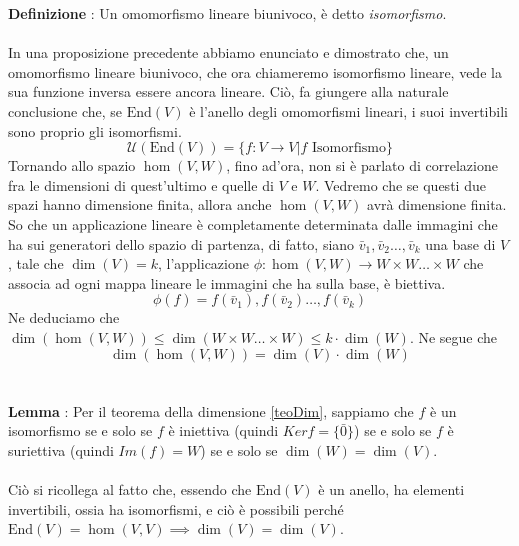 \documentclass[12pt, letterpaper]{article}
\newcommand{\ve}{{\bar v}}
\newcommand{\acc}{\\\hphantom{}\\}
\newcommand{\End}{{\text{End}}}
\begin{document}
 \textbf{Definizione} : Un omomorfismo lineare biunivoco, è detto \textit{isomorfismo}.\acc 
 In una proposizione precedente abbiamo enunciato e dimostrato che, un omomorfismo lineare biunivoco, che ora chiameremo 
 isomorfismo lineare, vede la sua funzione inversa essere ancora lineare. Ciò, fa giungere alla naturale conclusione che, 
 se \(\End(V)\) è l'anello degli omomorfismi lineari, i suoi invertibili sono proprio gli isomorfismi.
 $$\mathcal{U}(\End(V))=\{f:V\rightarrow V| f\text{ Isomorfismo}\}$$
 Tornando allo spazio \(\hom(V,W)\), fino ad'ora, non si è parlato di correlazione fra le dimensioni di quest'ultimo 
 e quelle di \(V\) e \(W\). Vedremo che se questi due spazi hanno dimensione finita, allora 
 anche \(\hom(V,W)\) avrà dimensione finita. So che un applicazione lineare è completamente determinata 
 dalle immagini che ha sui generatori dello spazio di partenza, di fatto, siano 
 \(\ve_1,\ve_2\dots,\ve_k\) una base di \(V\), tale che \(\dim(V)=k\), l'applicazione \(\phi:\hom(V,W)\rightarrow W\times W\dots \times W\) che associa 
 ad ogni mappa lineare le immagini che ha sulla base, è biettiva.$$\phi(f)=f(\ve_1),f(\ve_2)\dots,f(\ve_k)$$
 Ne deduciamo che \(\dim(\hom(V,W))\le\dim(W\times W\dots\times W)\le k\cdot \dim(W)\). Ne segue che 
 $$\dim(\hom(V,W))=\dim(V)\cdot \dim(W)$$\acc 
 \textbf{Lemma} : Per il teorema della dimensione \ref{teoDim}, sappiamo che \(f\) è un isomorfismo se e solo se \(f\) è iniettiva 
 (quindi \(Kerf=\{\bar 0\}\)) se e solo se \(f\) è suriettiva (quindi \(Im(f)=W\)) se e solo se \(\dim(W)=\dim(V)\).\acc 
 Ciò si ricollega al fatto che, essendo che \(\End(V)\) è un anello, ha elementi invertibili, ossia ha isomorfismi, e ciò 
 è possibili perché \(\End(V)=\hom(V,V)\implies \dim(V)=\dim(V)\).
\end{document}

